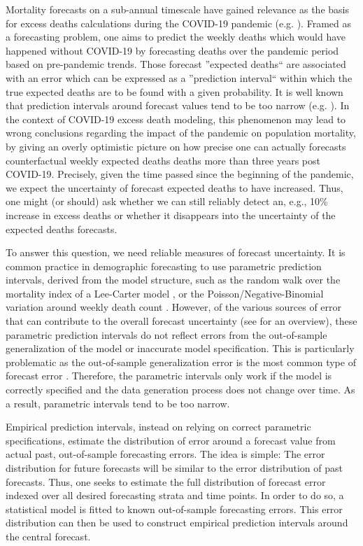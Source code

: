 \documentclass[12pt]{article}
\begin{document}
Mortality forecasts on a sub-annual timescale have gained relevance as the basis for excess deaths calculations during the COVID-19 pandemic (e.g. \cite{kontis2020magnitude, karlinsky2021tracking, aburto2021estimating}).
Framed as a forecasting problem, one aims to predict the weekly deaths which would have happened without COVID-19 by forecasting deaths over the pandemic period based on pre-pandemic trends. Those forecast ''expected deaths`` are associated with an error which can be expressed as a ''prediction interval`` within which the true expected deaths are to be found with a given probability. It is well known that prediction intervals around forecast values tend to be too narrow (e.g. \cite{chatfield1993calculating, chatfield1995model}).
In the context of COVID-19 excess death modeling, this phenomenon may lead to wrong conclusions regarding the impact of the pandemic on population mortality, by giving an overly optimistic picture on how precise one can actually forecasts counterfactual weekly expected deaths deaths more than three years post COVID-19. Precisely, given the time passed since the beginning of the pandemic, we expect the uncertainty of forecast expected deaths to have increased. Thus, one might (or should) ask whether we can still reliably detect an, e.g., 10\% increase in excess deaths or whether it disappears into the uncertainty of the expected deaths forecasts.

To answer this question, we need reliable measures of forecast uncertainty. It is common practice in demographic forecasting to use parametric prediction intervals, derived from the model structure, such as the random walk over the mortality index of a Lee-Carter model \cite{lee1992modeling}, or the Poisson/Negative-Binomial variation around weekly death count \cite{aburto2021estimating, msemburi2023estimates}. However, of the various sources of error that can contribute to the overall forecast uncertainty (see \cite{Keilman1990} for an overview), these parametric prediction intervals do not reflect errors from the out-of-sample generalization of the model or inaccurate model specification. This is particularly problematic as the out-of-sample generalization error is the most common type of forecast error \cite{Keilman1990}. Therefore, the parametric intervals only work if the model is correctly specified and the data generation process does not change over time. As a result, parametric intervals tend to be too narrow.

Empirical prediction intervals, instead on relying on correct parametric specifications, estimate the distribution of error around a forecast value from actual past, out-of-sample forecasting errors. The idea is simple: The error distribution for future forecasts will be similar to the error distribution of past forecasts. Thus, one seeks to estimate the full distribution of forecast error indexed over all desired forecasting strata and time points. In order to do so, a statistical model is fitted to known out-of-sample forecasting errors. This error distribution can then be used to construct empirical prediction intervals around the central forecast.
\end{document}
